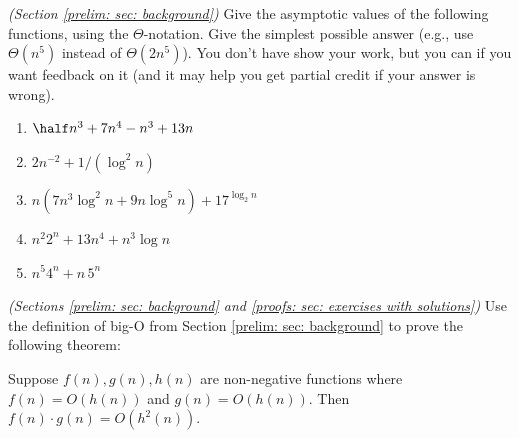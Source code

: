 \documentclass[11pt]{article}
\begin{document}





\newpage 

\problem \emph{(Section \ref{prelim: sec: background})}
Give the asymptotic values of the following functions, using the $\Theta$-notation.
Give the simplest possible answer (e.g., use $\Theta(n^5)$ instead of $\Theta(2n^5)$).
You don't have show your work, but you can if you want feedback on it
(and it may help you get partial credit if your answer is wrong). 
% 
% 
\begin{enumerate}[label=(\alph*)]
\item $\half n^3 + 7 n^4 - n^3 + 13n$
\item $2n^{-2} + 1/(\log^2 n)$
\item $n ( 7n^3\log^2 n + 9 n\log^5n) + 17^{\log_2 n}$
\item $n^2 2^n + 13n^4 + n^3\log n$
\item $n^5 4^n + n\, 5^n$
\end{enumerate}






\newpage 

\problem\emph{(Sections \ref{prelim: sec: background} and \ref{proofs: sec: exercises with solutions})}
Use the definition of big-O from Section \ref{prelim: sec: background} to prove the following theorem:

\begin{theorem}
  Suppose $f(n), g(n), h(n)$ are non-negative functions where $f(n) = O(h(n))$ and $g(n) = O(h(n))$.
  Then $f(n)\cdot g(n) = O(h^2(n))$.
\end{theorem}
\end{document}
